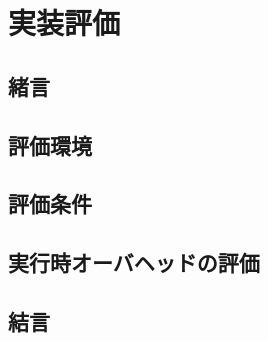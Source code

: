 \section{実装評価}
\subsection{緒言}

\subsection{評価環境}

\subsection{評価条件}

\subsection{実行時オーバヘッドの評価}

\subsection{結言}